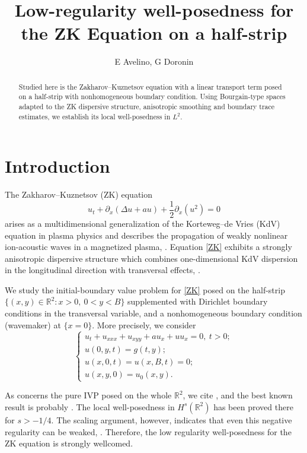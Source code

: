 \documentclass[11pt]{article}
\title{Low-regularity well-posedness for the ZK Equation on a half-strip}
\author{E Avelino, G Doronin}
\date{}
\numberwithin{equation}{section}
\begin{document}
\maketitle

\begin{abstract}
Studied here is the Zakharov--Kuznetsov equation with a linear transport
term posed on a half-strip with nonhomogeneous boundary condition.
Using Bourgain-type spaces adapted to the ZK dispersive structure,
anisotropic smoothing and boundary trace estimates, we establish its local well-posedness in $L^2.$
\end{abstract}

\section{Introduction}

The Zakharov--Kuznetsov (ZK) equation
\begin{equation}
\label{ZK} u_{t} + \partial_{x}\left(\Delta u + a u\right) +\frac12
\partial_x(u^2)=0
\end{equation}
arises as a multidimensional generalization of the Korteweg--de
Vries (KdV) equation in plasma physics and describes the propagation
of weakly nonlinear ion-acoustic waves in a magnetized plasma,
\cite{zk}. Equation \eqref{ZK} exhibits a strongly anisotropic
dispersive structure which combines one-dimensional KdV dispersion
in the longitudinal direction with transversal effects, \cite{LP}.

We study the initial-boundary value problem for \eqref{ZK}
posed on the half-strip $\{(x,y)\in \mathbb{R}^{2}: x>0,\ 0<y<B\}$ supplemented with
Dirichlet boundary conditions in the transversal variable, and a
nonhomogeneous boundary condition (wavemaker) at $\{x=0\}.$ More
precisely, we consider
\begin{equation}\label{IBVP}
\begin{cases}
u_{t} + u_{xxx} + u_{xyy} + a u_{x} +uu_{x}=0,\ t>0;\\
u(0,y,t)=g(t,y);\\ u(x,0,t)=u(x,B,t)=0;\\ u(x,y,0)=u_0(x,y).
\end{cases}
\end{equation}

As concerns the pure IVP posed on the whole $\mathbb{R}^{2}$, we cite \cite{F95, GH, FP}, and the best known result is probably \cite{kinoshita}. The local well-posedness in $H^{s}(\mathbb{R}^{2})$ has been proved there for $s>-1/4$. The scaling argument, however, indicates that even this negative regularity can be weaked, \cite{SL}. Therefore, the low regularity well-posedness for the ZK equation is strongly wellcomed.
\end{document}
